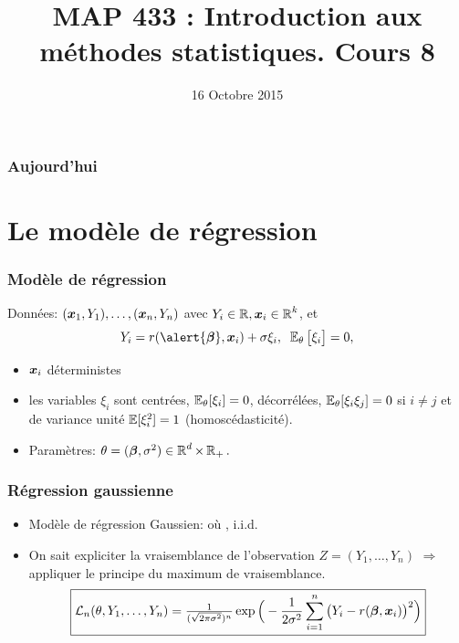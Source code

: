 


\title{MAP 433 : Introduction aux méthodes statistiques. Cours 8}

\date{16 Octobre 2015}
\maketitle



\begin{frame}
\frametitle{Aujourd'hui}
\tableofcontents
\end{frame}

\section{Le modèle de régression}
\begin{frame}
\frametitle{Modèle de régression}
\begin{df}
Données: $(\operatorname{\boldsymbol{x}}_1,Y_1),\ldots, (\operatorname{\boldsymbol{x}}_n,Y_n)$ avec $Y_i \in \operatorname{{\mathbb R}}, \operatorname{\boldsymbol{x}}_i\in \operatorname{{\mathbb R}}^k$, et
$$
Y_i = r(\alert{\truebeta},\bx_i)+ \sigma \xi_i,\;\;\E_{\truetheta}\big[\xi_i\big]=0,
$$
\begin{itemize}
\item \alert<1>{$\operatorname{\boldsymbol{x}}_i$ déterministes}
\item \alert<2>{ les variables $\xi_i$ sont centrées, $\operatorname{{\mathbb E}}_{\theta}[\xi_i]=0$,
décorrélées, $\operatorname{{\mathbb E}}_{\theta}[\xi_i \xi_j]= 0$ si $i \ne j$ et de variance unité $\operatorname{{\mathbb E}}[\xi_i^2]= 1$ \alert{ (homoscédasticité)}.}
\item \alert<3>{\alert{Paramètres}: $\theta= (\boldsymbol{\beta},\sigma^2) \in  \operatorname{{\mathbb R}}^d \times \operatorname{{\mathbb R}}_+.$}
\end{itemize}
\end{df}


\end{frame}

\begin{frame}
\frametitle{Régression gaussienne}


\begin{itemize}
\item  \alert{Modèle de régression Gaussien}:
où , i.i.d.
\item \alert{On sait expliciter la vraisemblance  de l'observation} $Z=(Y_1,\dots,Y_n)$ $\Longrightarrow$ appliquer le
principe du maximum de vraisemblance.
$$\boxed{{\mathcal L}_n(\theta, Y_1,\ldots, Y_n)
= \tfrac{1}{(\sqrt{2\pi \sigma^2})^{n}} \exp\Big(-\frac{1}{2\sigma^2}\sum_{i = 1}^n\big(Y_i-
r({\boldsymbol{\beta}},\operatorname{\boldsymbol{x}}_i)\big)^2\Big)}$$

\end{itemize}
\end{frame}


